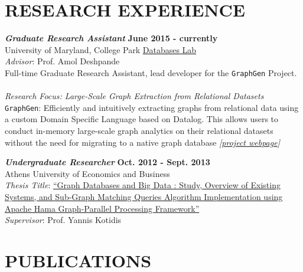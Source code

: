 \documentclass[margin, 10pt]{res} %
\begin{document}
\begin{resume}

\section{RESEARCH EXPERIENCE}

{\sl \textbf{Graduate Research Assistant}} \hfill \textbf{June 2015 - currently} \\
University of Maryland, College Park \href{http://www.cs.umd.edu/~amol/DBGroup/pubs.html}{Databases Lab}\\
\textit{Advisor}: Prof. Amol Deshpande\\
Full-time Graduate Research Assistant, lead developer for the \texttt{GraphGen} Project.\\
\\
{\sl \textit{Research Focus}: Large-Scale Graph Extraction from Relational Datasets}\\
   \texttt{GraphGen}: Efficiently and intuitively extracting graphs from relational data using a custom Domain Specific Language based on Datalog. This allows users to conduct in-memory large-scale graph analytics on their relational datasets without the need for migrating to a native graph database \textit{[\href{http://konstantinosx.github.io/graphgen-project/}{project webpage}]}

{\sl \textbf{Undergraduate Researcher}} \hfill \textbf{Oct. 2012 - Sept. 2013}\\
Athens University of Economics and Business\\
\textit{Thesis Title}:
\href{https://drive.google.com/open?id=0B20MIwp_I7FlVFlNVWtQb3VXTmM}{``Graph Databases and Big Data : Study, Overview of Existing Systems, and Sub-Graph Matching Queries Algorithm Implementation using Apache Hama Graph-Parallel Processing Framework''}\\
\textit{Supervisor}: Prof. Yannis Kotidis


\section{PUBLICATIONS }


\end{resume}
\end{document}
